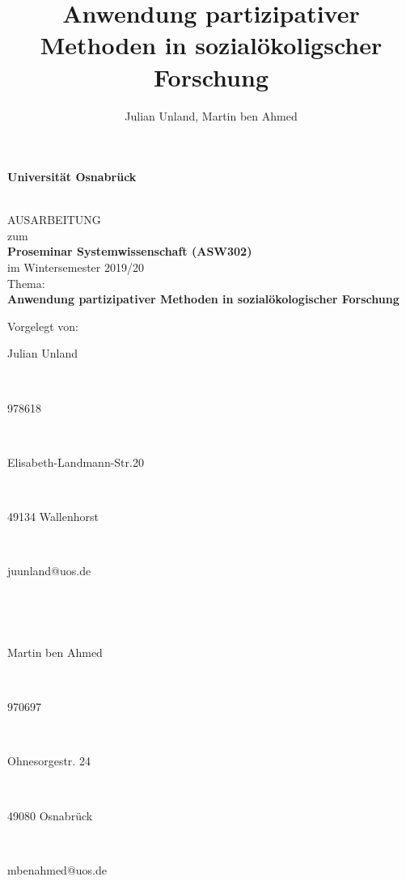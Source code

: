 \documentclass[a4paper, 12pt, DIV=11, listof=numbered, numbers=noenddot]{scrartcl}
\title{Anwendung partizipativer Methoden in sozialökoligscher Forschung}
\author{Julian Unland, Martin ben Ahmed}
\begin{document}
	
	
	\begin{titlepage}
		\begin{center}
			\vspace*{1.5cm}
			\begin{Large}
				\textbf{Universit\"at Osnabr\"uck}
			\end{Large}
			
			\noindent\hrulefill
			\\[3.5cm]
			AUSARBEITUNG \\[1cm]
			zum  \\[1cm]
			\textbf{Proseminar Systemwissenschaft (ASW302)} \\[1.5cm]    %
			im Wintersemester 2019/20 \\[1.5cm]   %
			Thema: \\[0.5cm]
			\textbf{Anwendung partizipativer Methoden in sozialökologischer Forschung} \\[2cm]        %
		
		\end{center}
		\vfill
		\begin{flushleft}
			Vorgelegt von: 
			\hfill \parbox{60mm}{Julian Unland} \\  %
			\hfill \parbox{60mm}{978618} \\
			\hfill \parbox{60mm}{Elisabeth-Landmann-Str.20} \\
			\hfill \parbox{60mm}{49134 Wallenhorst} \\
			\hfill \parbox{60mm}{juunland@uos.de} \\
			\hfill \parbox{60mm}{} \\
			\hfill \parbox{60mm}{Martin ben Ahmed} \\  %
			\hfill \parbox{60mm}{970697} \\
			\hfill \parbox{60mm}{Ohnesorgestr. 24} \\
			\hfill \parbox{60mm}{49080 Osnabrück} \\
			\hfill \parbox{60mm}{mbenahmed@uos.de}
		\end{flushleft}
	\end{titlepage}
	
	
	\newpage
	\tableofcontents 
	
\end{document}
